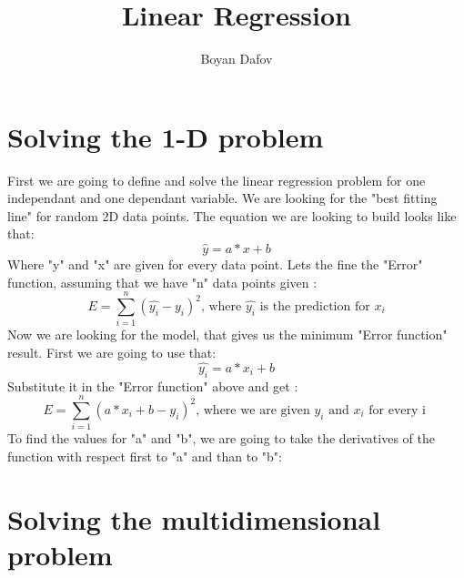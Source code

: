 \documentclass{article}
\begin{document}
\title{Linear Regression}
\author{Boyan Dafov}
\maketitle
\newpage
\section{Solving the 1-D problem}
	First we are going to define and solve the linear regression problem for one independant and one dependant variable. We are looking for the "best fitting line" for random 2D data points. The equation we are looking to build looks like that:
\begin{equation*}
\hat{y} = a * x + b
\end{equation*}
	Where "y" and "x" are given for every data point. Lets the fine the "Error" function, assuming that we have "n" data points given :
\begin{equation*}
E = \sum_{i=1}^{n} (\hat{y_i} - y_i) ^ 2
\text{, where } 
\hat{y_i} 
\text{ is the prediction for }
x_i
\end{equation*}
Now we are looking for the model, that gives us the minimum "Error function" result. First we are going to use that:
\begin{equation*}
\hat{y_i} = a * x_i + b
\end{equation*}
Substitute it in the "Error function" above and get :
\begin{equation*}
E = \sum_{i=1}^{n} (a * x_i + b - y_i) ^ 2
\text{, where we are given } 
y_i 
\text{ and }
x_i
\text{ for every i }
\end{equation*}
To find the values for "a" and "b", we are going to take the derivatives of the function with respect first to "a" and than to "b":
\section{Solving the multidimensional problem}
\end{document}
